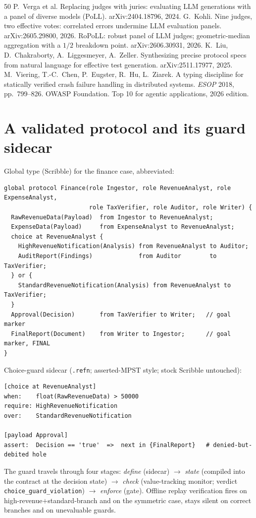 \documentclass{article}
\begin{document}
\begin{thebibliography}{50}
 P.~Verga et al. Replacing judges with juries: evaluating LLM generations with a panel of diverse models (PoLL). arXiv:2404.18796, 2024.
 G.~Kohli. Nine judges, two effective votes: correlated errors undermine LLM evaluation panels. arXiv:2605.29800, 2026.
 RoPoLL: robust panel of LLM judges; geometric-median aggregation with a $1/2$ breakdown point. arXiv:2606.30931, 2026.
 K.~Liu, D.~Chakraborty, A.~Liggesmeyer, A.~Zeller. Synthesizing precise protocol specs from natural language for effective test generation. arXiv:2511.17977, 2025.
 M.~Viering, T.-C.~Chen, P.~Eugster, R.~Hu, L.~Ziarek. A typing discipline for statically verified crash failure handling in distributed systems. \emph{ESOP} 2018, pp.~799--826.
 OWASP Foundation. Top 10 for agentic applications, 2026 edition.
\end{thebibliography}

\appendix
\section{A validated protocol and its guard sidecar}\label{app:scr}
Global type (Scribble) for the finance case, abbreviated:
{\small\begin{verbatim}
global protocol Finance(role Ingestor, role RevenueAnalyst, role ExpenseAnalyst,
                        role TaxVerifier, role Auditor, role Writer) {
  RawRevenueData(Payload)  from Ingestor to RevenueAnalyst;
  ExpenseData(Payload)     from ExpenseAnalyst to RevenueAnalyst;
  choice at RevenueAnalyst {
    HighRevenueNotification(Analysis) from RevenueAnalyst to Auditor;
    AuditReport(Findings)             from Auditor        to TaxVerifier;
  } or {
    StandardRevenueNotification(Analysis) from RevenueAnalyst to TaxVerifier;
  }
  Approval(Decision)       from TaxVerifier to Writer;   // goal marker
  FinalReport(Document)    from Writer to Ingestor;      // goal marker, FINAL
}
\end{verbatim}}
Choice-guard sidecar (\texttt{.refn}; asserted-MPST style; stock Scribble untouched):
{\small\begin{verbatim}
[choice at RevenueAnalyst]
when:    float(RawRevenueData) > 50000
require: HighRevenueNotification
over:    StandardRevenueNotification

[payload Approval]
assert:  Decision == 'true'  =>  next in {FinalReport}   # denied-but-debited hole
\end{verbatim}}
The guard travels through four stages: \emph{define} (sidecar) $\to$ \emph{state} (compiled into the contract at the decision state) $\to$ \emph{check} (value-tracking monitor; verdict \texttt{choice\_guard\_violation}) $\to$ \emph{enforce} (gate). Offline replay verification fires on high-revenue$+$standard-branch and on the symmetric case, stays silent on correct branches and on unevaluable guards.
\end{document}
